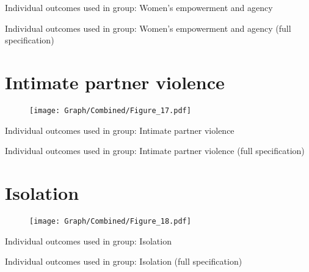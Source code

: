 \documentclass[10pt,a4paper]{article}
\begin{document}
\begin{table}[H]\centering\caption{Individual outcomes used in group: Women's empowerment and agency }
\resizebox{\textwidth}{!}{}
\end{table}
\begin{table}[H]\centering\caption{Individual outcomes used in group: Women's empowerment and agency (full specification)}
\resizebox{\textwidth}{!}{}
\end{table}
\pagebreak
\section{Intimate partner violence}
\begin{table}[H]\centering

\end{table}
\begin{figure}[H]\centering
\texttt{[image: Graph/Combined/Figure\_17.pdf]}
\caption{} \label{fig:Fig_17}
\end{figure}

\begin{table}[H]\centering\caption{Individual outcomes used in group: Intimate partner violence }
\resizebox{\textwidth}{!}{}
\end{table}
\begin{table}[H]\centering\caption{Individual outcomes used in group: Intimate partner violence (full specification)}
\resizebox{\textwidth}{!}{}
\end{table}
\pagebreak
\section{Isolation}
\begin{table}[H]\centering

\end{table}
\begin{figure}[H]\centering
\texttt{[image: Graph/Combined/Figure\_18.pdf]}
\caption{} \label{fig:Fig_18}
\end{figure}

\begin{table}[H]\centering\caption{Individual outcomes used in group: Isolation }
\resizebox{\textwidth}{!}{}
\end{table}
\begin{table}[H]\centering\caption{Individual outcomes used in group: Isolation (full specification)}
\resizebox{\textwidth}{!}{}
\end{table}
\pagebreak
\end{document}
